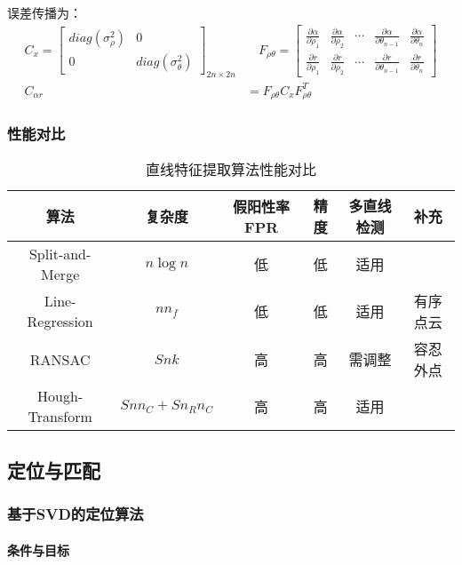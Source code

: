 \documentclass[
12pt, %
a4paper, 
oneside, %
headinclude,footinclude, %
]{scrartcl}
\begin{document}
误差传播为：
\begin{align*}
C_x = \begin{bmatrix} diag(\sigma_\rho^2) & 0 \\ 0 & diag(\sigma_\theta^2) \end{bmatrix}_{2n \times 2n} &\quad
F_{\rho \theta} = \begin{bmatrix} \frac{\partial \alpha}{\partial \rho_1} & \frac{\partial \alpha}{\partial \rho_2} & \cdots & \frac{\partial \alpha}{\partial \theta_{n - 1}} & \frac{\partial \alpha}{\partial \theta_n} \\ \frac{\partial r}{\partial \rho_1} & \frac{\partial r}{\partial \rho_2} & \cdots & \frac{\partial r}{\partial \theta_{n - 1}} & \frac{\partial r}{\partial \theta_n} \end{bmatrix} \\
C_{\alpha r} &= F_{\rho \theta} C_x F_{\rho \theta}^T    
\end{align*}
\subsubsection[性能对比]{性能对比}
\begin{table}[H]
\centering
\begin{tabular}{c|ccccc}
\hline
算法 & 复杂度 & 假阳性率FPR & 精度 & 多直线检测 & 补充 \\
\hline
Split-and-Merge & $ n \log n $ & 低 & 低 & 适用 &  \\
Line-Regression & $ n n_f $ & 低 & 低 & 适用 & 有序点云 \\
RANSAC & $ S n k $ & 高 & 高 & 需调整 & 容忍外点 \\
Hough-Transform & $ S n n_C + S n_R n_C $ & 高 & 高 & 适用 &  \\
\hline
\end{tabular}
\caption{直线特征提取算法性能对比}
\end{table}
\subsection[定位与匹配]{定位与匹配}
\subsubsection[基于SVD的定位算法]{基于SVD的定位算法}
\paragraph{条件与目标}~\\
\end{document}
